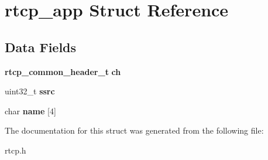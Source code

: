\section{rtcp\+\_\+app Struct Reference}
\label{structrtcp__app}
\subsection*{Data Fields}
\begin{DoxyCompactItemize}
\item 
\mbox{\label{structrtcp__app_a137e33cfdc5a76428ac4772f74b3ee1e}} 
\textbf{ rtcp\+\_\+common\+\_\+header\+\_\+t} {\bfseries ch}
\item 
\mbox{\label{structrtcp__app_a4c715cd77172c3e5804e422bb2723478}} 
uint32\+\_\+t {\bfseries ssrc}
\item 
\mbox{\label{structrtcp__app_a92793ae072761ec57f5431a8312e77bf}} 
char {\bfseries name} [4]
\end{DoxyCompactItemize}


The documentation for this struct was generated from the following file\+:\begin{DoxyCompactItemize}
\item 
rtcp.\+h\end{DoxyCompactItemize}
